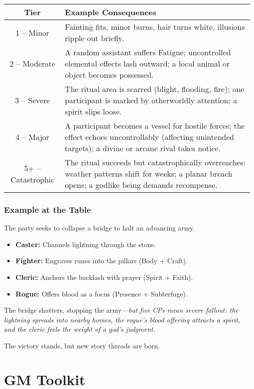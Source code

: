 \documentclass[12pt]{article}
\begin{document}
\begin{tabular}{|c|p{10cm}|}
\hline
\textbf{Tier} & \textbf{Example Consequences} \\
\hline
1 -- Minor & Fainting fits, minor burns, hair turns white, illusions ripple out briefly. \\
\hline
2 -- Moderate & A random assistant suffers Fatigue; uncontrolled elemental effects lash outward; a local animal or object becomes possessed. \\
\hline
3 -- Severe & The ritual area is scarred (blight, flooding, fire); one participant is marked by otherworldly attention; a spirit slips loose. \\
\hline
4 -- Major & A participant becomes a vessel for hostile forces; the effect echoes uncontrollably (affecting unintended targets); a divine or arcane rival takes notice. \\
\hline
5+ -- Catastrophic & The ritual succeeds but catastrophically overreaches: weather patterns shift for weeks; a planar breach opens; a godlike being demands recompense. \\
\hline
\end{tabular}

\section*{Example at the Table}
The party seeks to collapse a bridge to halt an advancing army.
\begin{itemize}
  \item \textbf{Caster:} Channels lightning through the stone. 
  \item \textbf{Fighter:} Engraves runes into the pillars (Body + Craft). 
  \item \textbf{Cleric:} Anchors the backlash with prayer (Spirit + Faith). 
  \item \textbf{Rogue:} Offers blood as a focus (Presence + Subterfuge). 
\end{itemize}

The bridge shatters, stopping the army—\emph{but five CPs mean severe fallout: the lightning spreads into nearby homes, the rogue’s blood offering attracts a spirit, and the cleric feels the weight of a god’s judgment}. 

The victory stands, but new story threads are born.


\part{GM Toolkit}
\end{document}

